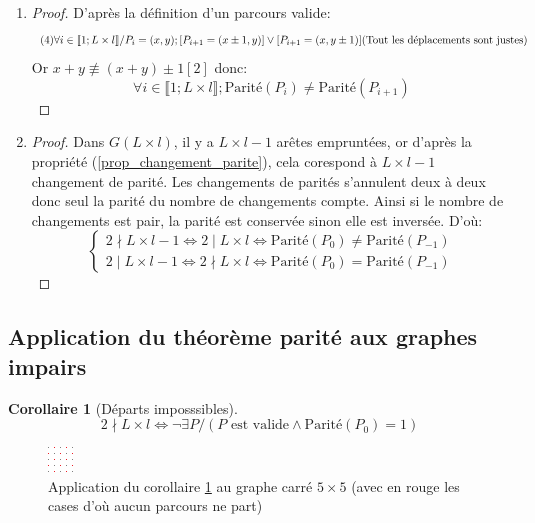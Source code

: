 \documentclass[twoside, a4paper, 12pt]{report}
\newtheorem{corollary}{Corollaire}[theorem]
\newcommand{\parite}[1]{\ensuremath{\text{Parité}(#1)}}
\begin{document}

\begin{enumerate}
\item
\begin{proof}
D'après la définition d'un parcours valide: 
\[(4) \forall i \in \llbracket 1; L \times l \rrbracket / P_i = (x, y);  [P_{i+1} = (x \pm 1, y)] \lor[P_{i+1} = (x, y\pm1)] \\(\text{Tout les déplacements sont justes})\]
Or $x + y \not \equiv (x + y) \pm 1 [2]$ donc:
\[ \forall i \in \llbracket 1; L \times l \rrbracket; \parite{P_i} \not = \parite{P_{i+1}}\] 
\end{proof}

\item
\begin{proof}
Dans $G(L \times l)$, il y a $L \times l - 1$ arêtes empruntées, or d'après la propriété (\ref{prop_changement_parite}), cela corespond à $L \times l - 1$ changement de parité. Les changements de parités s'annulent deux à deux donc seul la parité du nombre de changements compte. Ainsi si le nombre de changements est pair, la parité est conservée sinon elle est inversée. D'où:
\[
\left\{
    \begin{array}{lll}
        2 \nmid L \times l - 1 \Leftrightarrow 2 \mid L \times l \Leftrightarrow \parite{P_0} \not= \parite{P_{-1}}\\
       2 \mid L \times l  - 1\Leftrightarrow  2 \nmid L \times l \Leftrightarrow \parite{P_0} = \parite{P_{-1}} 
    \end{array}
\right.
\]
\end{proof}
\end{enumerate}



\subsection{Application du théorème parité aux graphes impairs}

\begin{corollary}[Départs imposssibles] \label{coro_th_parite}
\[ 2 \nmid L \times l \Leftrightarrow \lnot \exists P/ (P \text{ est valide} \land \parite{P_0} = 1) \]
\end{corollary}
\begin{figure}[h!]
\centering\includegraphics[scale=5]{graphe(5_5)_marquer.png}
\caption[Application du corollaire \ref{coro_th_parite} au graphe carré $5 \times 5$]{Application du corollaire \ref{coro_th_parite} au graphe carré $5 \times 5$ (avec en rouge les cases d'où aucun parcours ne part)}
\label{graphe_carre_impossible_c5}
\end{figure}
\end{document}
